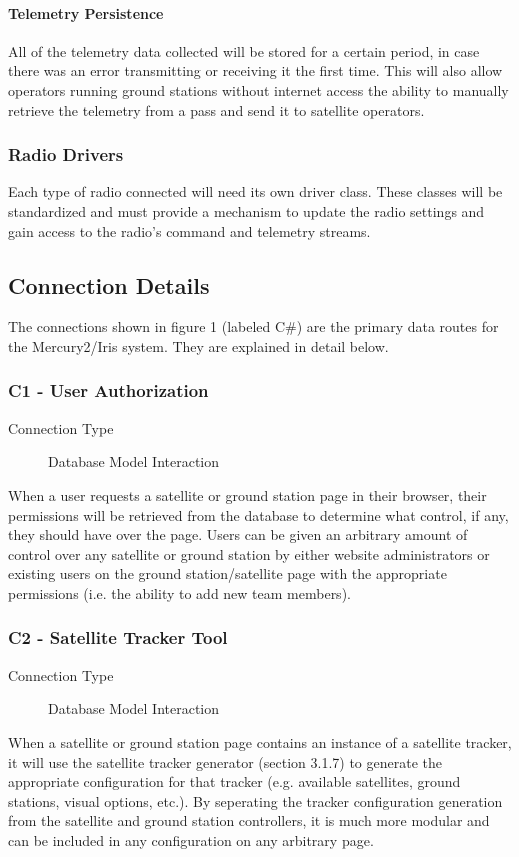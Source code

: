 \documentclass{mxl-note}
\begin{document}
\paragraph{Telemetry Persistence}
All of the telemetry data collected will be stored for a certain period, in case there was an error transmitting or receiving it the first time. This will also allow operators running ground stations without internet access the ability to manually retrieve the telemetry from a pass and send it to satellite operators.

\subsubsection{Radio Drivers}
Each type of radio connected will need its own driver class. These classes will be standardized and must provide a mechanism to update the radio settings and gain access to the radio's command and telemetry streams.

\subsection{Connection Details}
The connections shown in figure 1 (labeled C\#) are the primary data routes for the Mercury2/Iris system. They are explained in detail below.

\subsubsection{C1 - User Authorization}
\begin{description}
	\item [Connection Type] Database Model Interaction
\end{description}
When a user requests a satellite or ground station page in their browser, their permissions will be retrieved from the database to determine what control, if any, they should have over the page. Users can be given an arbitrary amount of control over any satellite or ground station by either website administrators or existing users on the ground station/satellite page with the appropriate permissions (i.e. the ability to add new team members).

\subsubsection{C2 - Satellite Tracker Tool}
\begin{description}
	\item [Connection Type] Database Model Interaction
\end{description}
When a satellite or ground station page contains an instance of a satellite tracker, it will use the satellite tracker generator (section 3.1.7) to generate the appropriate configuration for that tracker (e.g. available satellites, ground stations, visual options, etc.). By seperating the tracker configuration generation from the satellite and ground station controllers, it is much more modular and can be included in any configuration on any arbitrary page.
\end{document}
